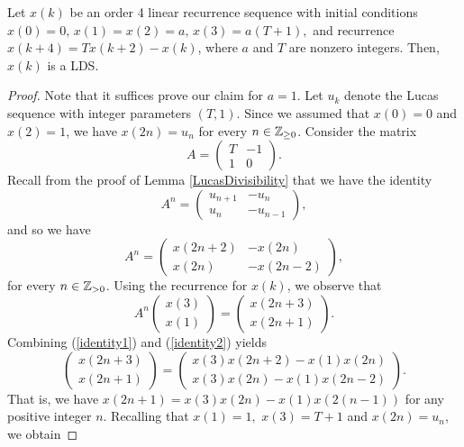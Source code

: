 \documentclass[11pt]{amsart}
\begin{document}
\begin{prop} \label{prop} Let $x(k)$ be an order 4 linear recurrence sequence with initial conditions
$x(0)=0, \, x(1)=x(2)=a, \, x(3)=a(T+1),$
and recurrence $x(k+4)=Tx(k+2)-x(k)$, where $a$ and $T$ are nonzero integers. Then, $x(k)$ is a LDS. 
\begin{proof} Note that it suffices prove our claim for $a=1$. 
Let $u_k$ denote the Lucas sequence with integer parameters $(T, 1)$. Since we assumed that $x(0)=0$ and $x(2)=1$, we have $x(2n)=u_n$ for every $n \in \mathbb{Z}_{\geq 0}$. Consider the matrix
\[A=\begin{pmatrix} T & -1 \\ 1 & 0 \end{pmatrix}.\]
Recall from the proof of Lemma \ref{LucasDivisibility} that we have the identity
\begin{equation} \label{identity0} A^n=\begin{pmatrix} u_{n+1}	& - u_n \\ u_n & -u_{n-1} \end{pmatrix},
\end{equation}
and so we have
\begin{equation} \label{identity1}
A^n= \begin{pmatrix} x(2n+2) & -x(2n) \\ x(2n) & -x(2n-2) \end{pmatrix},
\end{equation}
for every $n \in \mathbb{Z}_{>0}$. Using the recurrence for $x(k)$, we observe that
\begin{equation} \label{identity2}
A^n \begin{pmatrix} x(3) \\ x(1) \end{pmatrix}=\begin{pmatrix} x(2n+3) \\ x(2n+1) \end{pmatrix}.
\end{equation}
Combining (\ref{identity1}) and (\ref{identity2}) yields
\[\begin{pmatrix} x(2n+3) \\ x(2n+1) \end{pmatrix} = \begin{pmatrix} x(3)x(2n+2) -x(1)x(2n) \\ x(3)x(2n)-x(1)x(2n-2) \end{pmatrix}.\]
That is, we have $x(2n+1)=x(3)x(2n)-x(1)x(2(n-1))$ for any positive integer $n$. Recalling that $x(1)=1,$ $x(3)=T+1$ and $x(2n)=u_n$, we obtain

\end{proof}
\end{prop}
\end{document}
